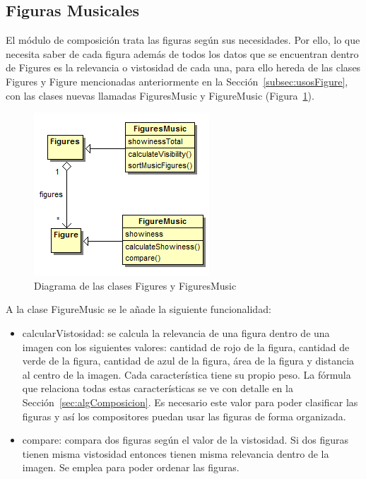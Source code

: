 \subsection{Figuras Musicales}

El módulo de composición trata las figuras según sus necesidades. Por ello, lo que necesita saber de cada figura además de todos los datos que se encuentran dentro de Figures es la relevancia o vistosidad de cada una, para ello hereda de las clases Figures y Figure mencionadas anteriormente en la Sección~\ref{subsec:usosFigure}, con las clases nuevas llamadas FiguresMusic y FigureMusic (Figura~\ref{fig:diagramaClasesFigureMusic}).

		\begin{figure}[!htbp]
		\centering
		\includegraphics[scale=0.6]{graphics/diagramaClasesFigureMusic.png}
		\caption{Diagrama de las clases Figures y FiguresMusic}
		\label{fig:diagramaClasesFigureMusic}
		\end{figure}

A la clase FigureMusic se le añade la siguiente funcionalidad:

\begin{itemize}

	\item{calcularVistosidad}: se calcula la relevancia de una figura dentro de una imagen con los siguientes valores: cantidad de rojo de la figura, cantidad de verde de la figura, cantidad de azul de la figura, área de la figura y distancia al centro de la imagen. Cada característica tiene su propio peso. La fórmula que relaciona todas estas características se ve con detalle en la Sección~\ref{sec:algComposicion}. Es necesario este valor para poder clasificar las figuras y así los compositores puedan usar las figuras de forma organizada.

	\item{compare}: compara dos figuras según el valor de la vistosidad. Si dos figuras tienen misma vistosidad entonces tienen misma relevancia dentro de la imagen. Se emplea para poder ordenar las figuras.

\end{itemize}

